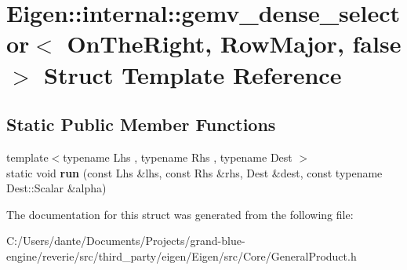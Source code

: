 \hypertarget{struct_eigen_1_1internal_1_1gemv__dense__selector_3_01_on_the_right_00_01_row_major_00_01false_01_4}{}\section{Eigen\+::internal\+::gemv\+\_\+dense\+\_\+selector$<$ On\+The\+Right, Row\+Major, false $>$ Struct Template Reference}
\label{struct_eigen_1_1internal_1_1gemv__dense__selector_3_01_on_the_right_00_01_row_major_00_01false_01_4}
\subsection*{Static Public Member Functions}
\begin{DoxyCompactItemize}
\item 
\mbox{\label{struct_eigen_1_1internal_1_1gemv__dense__selector_3_01_on_the_right_00_01_row_major_00_01false_01_4_afa82dad5040f5ee77dc8715e78029573}} 
{\footnotesize template$<$typename Lhs , typename Rhs , typename Dest $>$ }\\static void {\bfseries run} (const Lhs \&lhs, const Rhs \&rhs, Dest \&dest, const typename Dest\+::\+Scalar \&alpha)
\end{DoxyCompactItemize}


The documentation for this struct was generated from the following file\+:\begin{DoxyCompactItemize}
\item 
C\+:/\+Users/dante/\+Documents/\+Projects/grand-\/blue-\/engine/reverie/src/third\+\_\+party/eigen/\+Eigen/src/\+Core/General\+Product.\+h\end{DoxyCompactItemize}
